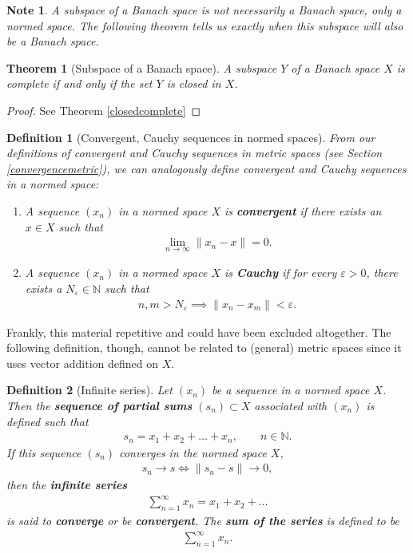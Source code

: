 \documentclass[11pt]{article}
\theoremstyle{mystyle}
\newtheorem{thm}{Theorem}[section]
\newtheorem{defn}{Definition}[section]
\newtheorem{note}{Note}[section]
\newcommand{\0}{\mathbf{0}}
\begin{document}
\begin{note}
A subspace of a Banach space is not necessarily a Banach space, only a normed space. The following theorem tells us exactly when this subspace will also be a Banach space.
\end{note}

\begin{thm}[Subspace of a Banach space]
A subspace $Y$ of a Banach space $X$ is complete if and only if the set $Y$ is closed in $X$.
\end{thm}
\begin{proof}
See Theorem \ref{closedcomplete}
\end{proof}

\begin{defn}[Convergent, Cauchy sequences in normed spaces]
From our definitions of convergent and Cauchy sequences in metric spaces (see Section \ref{convergencemetric}), we can analogously define convergent and Cauchy sequences in a normed space:
\begin{enumerate}
    \item A sequence $(x_n)$ in a normed space $X$ is \textbf{convergent} if there exists an $x \in X$ such that
    \begin{align*}
        \lim_{n \to \infty} \|x_n - x\| = 0.
    \end{align*}
    \item A sequence $(x_n)$ in a normed space $X$ is \textbf{Cauchy} if for every $\varepsilon > 0$, there exists a $N_{\varepsilon} \in \mathbb{N}$ such that 
    \begin{align*}
        n, m > N_{\varepsilon} \implies \|x_n - x_m\| < \varepsilon.
    \end{align*}
\end{enumerate}
\end{defn}

Frankly, this material repetitive and could have been excluded altogether. The following definition, though, cannot be related to (general) metric spaces since it uses vector addition defined on $X$.
\begin{defn}[Infinite series]\label{seriesconverge}
Let $(x_n)$ be a sequence in a normed space $X$. Then the \textbf{sequence of partial sums} $(s_n) \subset X$ associated with $(x_n)$ is defined such that
\begin{align*}
    s_n = x_1 + x_2 + \ldots + x_n, \qquad n \in \mathbb{N}.
\end{align*}
If this sequence $(s_n)$ converges in the normed space $X$,
\begin{align*}
    s_n \longrightarrow s \iff \|s_n - s\| \longrightarrow 0,
\end{align*}
then the \textbf{infinite series}
\begin{align*}
    \sum_{n=1}^{\infty} x_n = x_1 + x_2 + \ldots
\end{align*}
is said to \textbf{converge} or be \textbf{convergent}. The \textbf{sum of the series} is defined to be
\begin{align*}
    \sum_{n=1}^{\infty}x_n.
\end{align*}
\end{defn}
\end{document}
